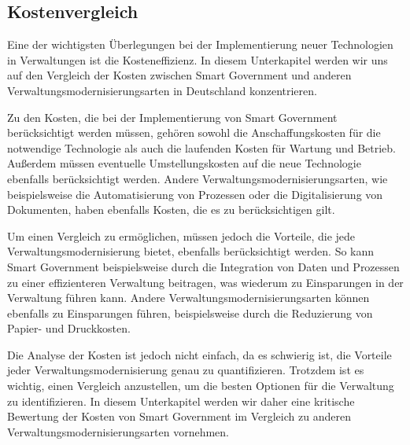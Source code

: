 \subsection{Kostenvergleich}
Eine der wichtigsten Überlegungen bei der Implementierung neuer Technologien in Verwaltungen ist die Kosteneffizienz.
In diesem Unterkapitel werden wir uns auf den Vergleich der Kosten zwischen Smart Government und anderen Verwaltungsmodernisierungsarten in Deutschland konzentrieren.
\par
Zu den Kosten, die bei der Implementierung von Smart Government berücksichtigt werden müssen, gehören sowohl die Anschaffungskosten für die notwendige Technologie als auch die laufenden Kosten für Wartung und Betrieb.
Außerdem müssen eventuelle Umstellungskosten auf die neue Technologie ebenfalls berücksichtigt werden.
Andere Verwaltungsmodernisierungsarten, wie beispielsweise die Automatisierung von Prozessen oder die Digitalisierung von Dokumenten, haben ebenfalls Kosten, die es zu berücksichtigen gilt.
\par
Um einen Vergleich zu ermöglichen, müssen jedoch die Vorteile, die jede Verwaltungsmodernisierung bietet, ebenfalls berücksichtigt werden.
So kann Smart Government beispielsweise durch die Integration von Daten und Prozessen zu einer effizienteren Verwaltung beitragen, was wiederum zu Einsparungen in der Verwaltung führen kann.
Andere Verwaltungsmodernisierungsarten können ebenfalls zu Einsparungen führen, beispielsweise durch die Reduzierung von Papier- und Druckkosten.
\par
Die Analyse der Kosten ist jedoch nicht einfach, da es schwierig ist, die Vorteile jeder Verwaltungsmodernisierung genau zu quantifizieren.
Trotzdem ist es wichtig, einen Vergleich anzustellen, um die besten Optionen für die Verwaltung zu identifizieren.
In diesem Unterkapitel werden wir daher eine kritische Bewertung der Kosten von Smart Government im Vergleich zu anderen Verwaltungsmodernisierungsarten vornehmen.